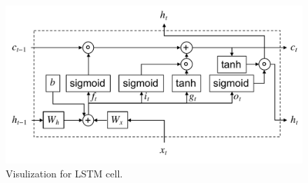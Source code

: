 \begin{figure}[!h]
	\centering
	\includegraphics[width=\fig\textwidth]{3-04.pdf}
    \caption{Visulization for LSTM cell.}
    \label{fig:lstmcell}
\end{figure}